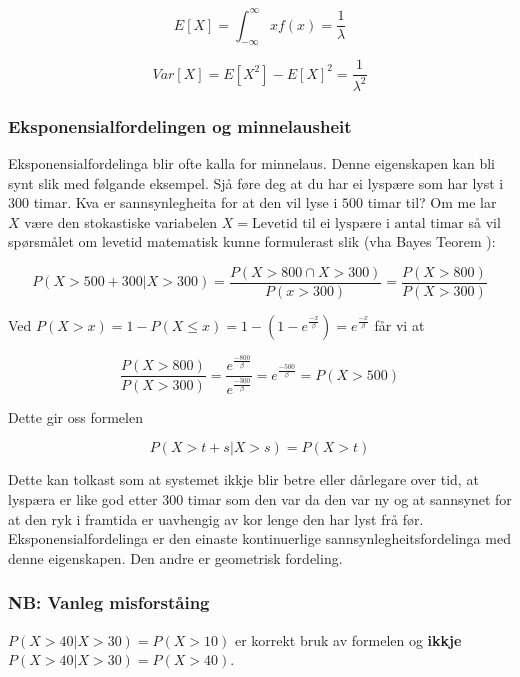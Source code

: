 \begin{equation}
    E[X] = \int_{-\infty}^{\infty} xf(x) = \frac{1}{\lambda}
\end{equation}

\begin{equation}
    Var[X] = E[X^2] - E[X]^2 = \frac{1}{\lambda^2}
\end{equation}

\subsubsection{Eksponensialfordelingen og minnelausheit} \label{memless}
Eksponensialfordelinga blir ofte kalla for minnelaus. \cite{wiki:memless} Denne eigenskapen kan bli synt slik med følgande eksempel. Sjå føre deg at du har ei lyspære som har lyst i $300$ timar. Kva er sannsynlegheita for at den vil lyse i $500$ timar til? Om me lar $X$ være den stokastiske variabelen $X = \text{Levetid til ei lyspære i antal timar}$ så vil spørsmålet om levetid matematisk kunne formulerast slik (vha Bayes Teorem \cite{wiki:bayes}):

\begin{equation}
    P(X > 500 + 300 | X > 300) = \frac{P(X > 800 \cap X > 300)}{P(x > 300)} = \frac{P(X > 800)}{P(X > 300)} 
\end{equation}

Ved $P(X > x) = 1 - P(X \leq x) = 1 - (1 - e^\frac{-x}{\beta}) = e^\frac{-x}{\beta}$ får vi at

\begin{equation}
    \frac{P(X > 800)}{P(X > 300)} = \frac{e^\frac{-800}{\beta}}{e^\frac{-300}{\beta}} = e^\frac{-500}{\beta} = P(X > 500)
\end{equation}

Dette gir oss formelen

\begin{equation}
    P(X > t + s | X > s) = P(X > t)
\end{equation}

Dette kan tolkast som at systemet ikkje blir betre eller dårlegare over tid, at lyspæra er like god etter 300 timar som den var da den var ny og at sannsynet for at den ryk i framtida er uavhengig av kor lenge den har lyst frå før. Eksponensialfordelinga er den einaste kontinuerlige sannsynlegheitsfordelinga med denne eigenskapen. Den andre er geometrisk fordeling. 

\subsubsection{NB: Vanleg misforståing}
$P(X > 40 | X > 30) = P(X > 10)$ er korrekt bruk av formelen og \textbf{ikkje}
$P(X > 40 | X > 30) = P(X > 40)$. 